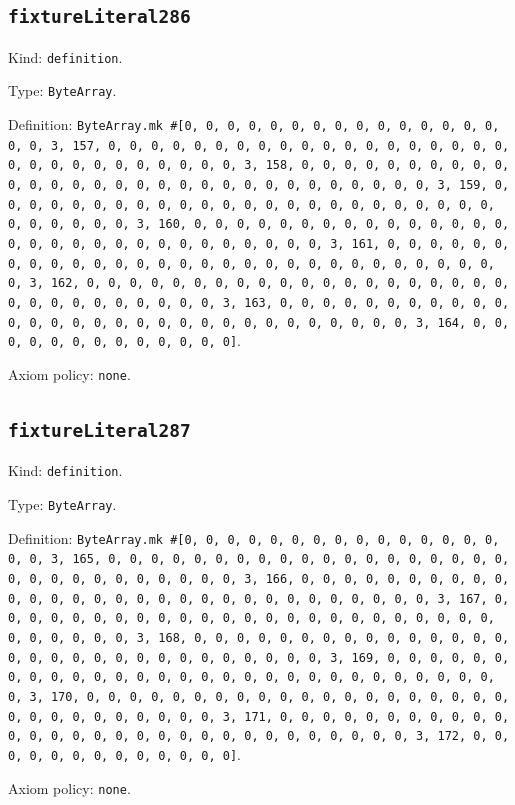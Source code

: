 \documentclass[11pt]{article}
\begin{document}
\subsection*{\texttt{fixtureLiteral286}}
\noindent Kind: \texttt{definition}.\par
\noindent Type: \texttt{ByteArray}.\par
\noindent Definition: \texttt{ByteArray.mk \#[0, 0, 0, 0, 0, 0, 0, 0, 0, 0, 0, 0, 0, 0, 0, 0, 0, 3, 157, 0, 0, 0, 0, 0, 0, 0, 0, 0, 0, 0, 0, 0, 0, 0, 0, 0, 0, 0, 0, 0, 0, 0, 0, 0, 0, 0, 0, 0, 0, 3, 158, 0, 0, 0, 0, 0, 0, 0, 0, 0, 0, 0, 0, 0, 0, 0, 0, 0, 0, 0, 0, 0, 0, 0, 0, 0, 0, 0, 0, 0, 0, 3, 159, 0, 0, 0, 0, 0, 0, 0, 0, 0, 0, 0, 0, 0, 0, 0, 0, 0, 0, 0, 0, 0, 0, 0, 0, 0, 0, 0, 0, 0, 0, 3, 160, 0, 0, 0, 0, 0, 0, 0, 0, 0, 0, 0, 0, 0, 0, 0, 0, 0, 0, 0, 0, 0, 0, 0, 0, 0, 0, 0, 0, 0, 0, 3, 161, 0, 0, 0, 0, 0, 0, 0, 0, 0, 0, 0, 0, 0, 0, 0, 0, 0, 0, 0, 0, 0, 0, 0, 0, 0, 0, 0, 0, 0, 0, 3, 162, 0, 0, 0, 0, 0, 0, 0, 0, 0, 0, 0, 0, 0, 0, 0, 0, 0, 0, 0, 0, 0, 0, 0, 0, 0, 0, 0, 0, 0, 0, 3, 163, 0, 0, 0, 0, 0, 0, 0, 0, 0, 0, 0, 0, 0, 0, 0, 0, 0, 0, 0, 0, 0, 0, 0, 0, 0, 0, 0, 0, 0, 0, 3, 164, 0, 0, 0, 0, 0, 0, 0, 0, 0, 0, 0, 0, 0]}.\par
\noindent Axiom policy: \texttt{none}.\par
\subsection*{\texttt{fixtureLiteral287}}
\noindent Kind: \texttt{definition}.\par
\noindent Type: \texttt{ByteArray}.\par
\noindent Definition: \texttt{ByteArray.mk \#[0, 0, 0, 0, 0, 0, 0, 0, 0, 0, 0, 0, 0, 0, 0, 0, 0, 3, 165, 0, 0, 0, 0, 0, 0, 0, 0, 0, 0, 0, 0, 0, 0, 0, 0, 0, 0, 0, 0, 0, 0, 0, 0, 0, 0, 0, 0, 0, 0, 3, 166, 0, 0, 0, 0, 0, 0, 0, 0, 0, 0, 0, 0, 0, 0, 0, 0, 0, 0, 0, 0, 0, 0, 0, 0, 0, 0, 0, 0, 0, 0, 3, 167, 0, 0, 0, 0, 0, 0, 0, 0, 0, 0, 0, 0, 0, 0, 0, 0, 0, 0, 0, 0, 0, 0, 0, 0, 0, 0, 0, 0, 0, 0, 3, 168, 0, 0, 0, 0, 0, 0, 0, 0, 0, 0, 0, 0, 0, 0, 0, 0, 0, 0, 0, 0, 0, 0, 0, 0, 0, 0, 0, 0, 0, 0, 3, 169, 0, 0, 0, 0, 0, 0, 0, 0, 0, 0, 0, 0, 0, 0, 0, 0, 0, 0, 0, 0, 0, 0, 0, 0, 0, 0, 0, 0, 0, 0, 3, 170, 0, 0, 0, 0, 0, 0, 0, 0, 0, 0, 0, 0, 0, 0, 0, 0, 0, 0, 0, 0, 0, 0, 0, 0, 0, 0, 0, 0, 0, 0, 3, 171, 0, 0, 0, 0, 0, 0, 0, 0, 0, 0, 0, 0, 0, 0, 0, 0, 0, 0, 0, 0, 0, 0, 0, 0, 0, 0, 0, 0, 0, 0, 3, 172, 0, 0, 0, 0, 0, 0, 0, 0, 0, 0, 0, 0, 0]}.\par
\noindent Axiom policy: \texttt{none}.\par
\end{document}

